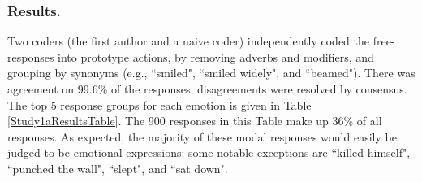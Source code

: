\documentclass[10pt,letterpaper]{article}
\newcommand{\ndg}[1]{\textcolor{Green}{[ndg: #1]}}
\begin{document}
\subsubsection{Results.} 
Two coders (the first author and a naive coder) independently coded the free-responses into prototype actions, by removing adverbs and modifiers, and grouping by synonyms (e.g., ``smiled", ``smiled widely", and ``beamed"). There was agreement on 99.6\% of the responses; disagreements were resolved by consensus.
The top 5 response groups for each emotion is given in Table \ref{Study1aResultsTable}. 
The 900 responses in this Table make up 36\% of all responses. 
As expected, the majority of these modal responses would easily be judged to be emotional expressions: some notable exceptions are ``killed himself", ``punched the wall", ``slept", and ``sat down".


\begin{table}
\caption{ Study 1a Results: Top 5 responses for each emotion, with frequency counts. The most common responses for anger were variants of ``hit X", where X is an object or person (of these, the modal was: ``punched the wall"). }
\label{Study1aResultsTable}
\end{table}


\end{document}

